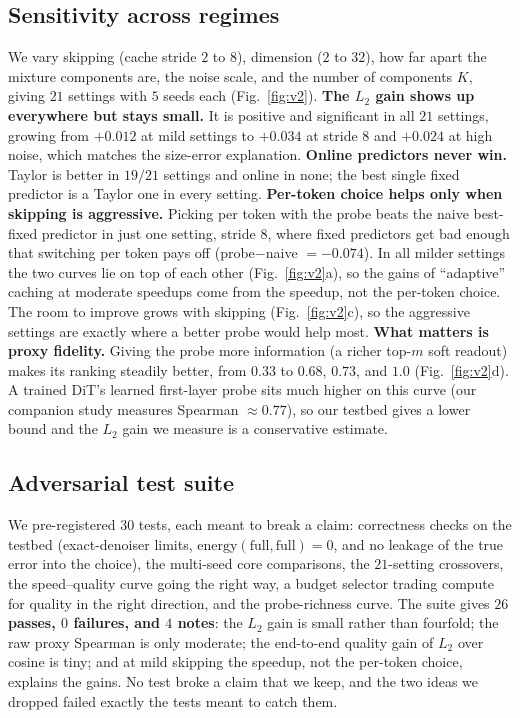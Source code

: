 \documentclass[10pt,twocolumn]{article}
\begin{document}
\subsection{Sensitivity across regimes}\label{sec:sweep}
We vary skipping (cache stride $2$ to $8$), dimension ($2$ to $32$), how far apart the
mixture components are, the noise scale, and the number of components $K$, giving $21$
settings with $5$ seeds each (Fig.~\ref{fig:v2}). \textbf{The $L_2$ gain shows up everywhere
but stays small.} It is positive and significant in all $21$ settings, growing from $+0.012$
at mild settings to $+0.034$ at stride $8$ and $+0.024$ at high noise, which matches the
size-error explanation. \textbf{Online predictors never win.} Taylor is better in $19/21$
settings and online in none; the best single fixed predictor is a Taylor one in every
setting. \textbf{Per-token choice helps only when skipping is aggressive.} Picking per token
with the probe beats the naive best-fixed predictor in just one setting, stride $8$, where
fixed predictors get bad enough that switching per token pays off (probe$-$naive $=-0.074$).
In all milder settings the two curves lie on top of each other (Fig.~\ref{fig:v2}a), so the
gains of ``adaptive'' caching at moderate speedups come from the speedup, not the per-token
choice. The room to improve grows with skipping (Fig.~\ref{fig:v2}c), so the aggressive
settings are exactly where a better probe would help most. \textbf{What matters is proxy
fidelity.} Giving the probe more information (a richer top-$m$ soft readout) makes its
ranking steadily better, from $0.33$ to $0.68$, $0.73$, and $1.0$ (Fig.~\ref{fig:v2}d). A
trained DiT's learned first-layer probe sits much higher on this curve (our companion study
measures Spearman ${\approx}0.77$\cite{challagundla2025probe}), so our testbed gives a lower
bound and the $L_2$ gain we measure is a conservative estimate.

\subsection{Adversarial test suite}
We pre-registered $30$ tests, each meant to break a claim: correctness checks on the testbed
(exact-denoiser limits, $\mathrm{energy}(\text{full},\text{full}){=}0$, and no leakage of the
true error into the choice), the multi-seed core comparisons, the $21$-setting crossovers,
the speed--quality curve going the right way, a budget selector trading compute for quality
in the right direction, and the probe-richness curve. The suite gives \textbf{$26$ passes,
$0$ failures, and $4$ notes}: the $L_2$ gain is small rather than fourfold; the raw proxy
Spearman is only moderate; the end-to-end quality gain of $L_2$ over cosine is tiny; and at
mild skipping the speedup, not the per-token choice, explains the gains. No test broke a
claim that we keep, and the two ideas we dropped failed exactly the tests meant to catch
them.
\end{document}
